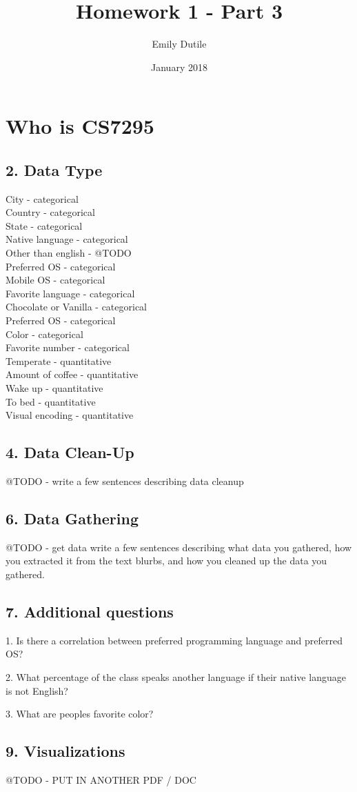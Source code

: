 \documentclass{neu_handout}
\title{Homework 1 - Part 3}
\author{Emily Dutile}
\date{January 2018}
\begin{document}
\section*{Who is CS7295}

\subsection*{2. Data Type}

City - categorical \\
Country - categorical \\ 
State - categorical \\
Native language - categorical \\
Other than english - @TODO \\
Preferred OS - categorical \\
Mobile OS - categorical \\
Favorite language - categorical \\
Chocolate or Vanilla - categorical \\
Preferred OS - categorical \\
Color - categorical \\
Favorite number - categorical \\
Temperate - quantitative \\
Amount of coffee - quantitative \\
Wake up - quantitative \\
To bed - quantitative \\
Visual encoding - quantitative

\subsection*{4. Data Clean-Up}
@TODO - write a few sentences describing data cleanup

\subsection*{6. Data Gathering}
@TODO - get data  write a few sentences describing what data you gathered, how you extracted it from the text blurbs, and how you cleaned up the data you gathered.

\subsection*{7. Additional questions}
1. Is there a correlation between preferred programming language and preferred OS?

2. What percentage of the class speaks another language if their native language is not English?

3. What are peoples favorite color?

\subsection*{9. Visualizations}
@TODO - PUT IN ANOTHER PDF / DOC
\end{document}
